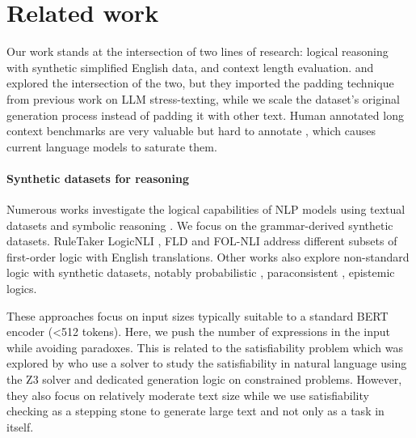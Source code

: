 \section{Related work}
Our work stands at the intersection of two lines of research: logical reasoning with synthetic simplified English data, and context length evaluation. \citet{levy2024same} and \citet{kuratov2024babilong} explored the intersection of the two, but they imported the padding technique from previous work on LLM stress-texting, while we scale the dataset's original generation process instead of padding it with other text.
Human annotated long context benchmarks are very valuable but hard to annotate \cite{bowman2022quality,wang2024novelqa,bai2024longbench}, which causes current language models to saturate them.

\paragraph{Synthetic datasets for reasoning}


Numerous works investigate the logical capabilities of NLP models using textual datasets and symbolic reasoning \cite{helwe2022logitorch}. We focus on the grammar-derived synthetic datasets. RuleTaker \citep{ruletaker} LogicNLI \citep{tian-etal-2021-diagnosing}, FLD \cite{fld23} and FOL-NLI \cite{sileo2024scaling} address different subsets of first-order logic with English translations. Other works also explore non-standard logic with synthetic datasets, notably probabilistic \citep{jin2023cladder,sileo2022probing}, paraconsistent \cite{kazemi2024boardgameqa}, epistemic \cite{sileo-lernould-2023-mindgames} logics.

These approaches focus on input sizes typically suitable to a standard BERT \cite{devlin2018bert} encoder (<512 tokens). Here, we push the number of expressions in the input while avoiding paradoxes. This is related to the satisfiability problem which was explored by \citet{fragmentsaaai,richardson2022pushing} who use a solver to study the satisfiability in natural language using the Z3 solver and dedicated generation logic on constrained problems.  However, they also focus on relatively moderate text size while we use satisfiability checking as a stepping stone to generate large text and not only as a task in itself.

